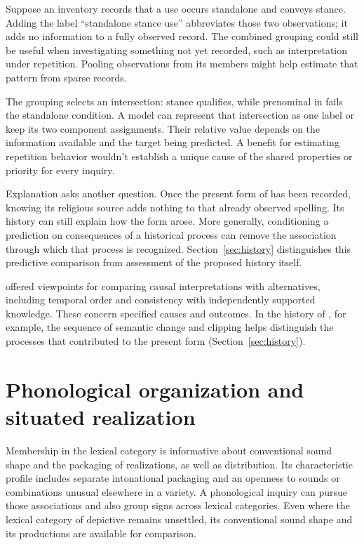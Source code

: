 \documentclass[12pt]{article}
\begin{document}
Suppose an inventory records that a use occurs standalone and conveys
stance. Adding the label \enquote{standalone stance use} abbreviates
those two observations; it adds no information to a fully observed
record. The combined grouping could still be useful when investigating
something not yet recorded, such as interpretation under repetition.
Pooling observations from its members might help estimate that pattern
from sparse records.

The grouping selects an intersection: stance  qualifies,
while prenominal  in  fails the
standalone condition. A model can represent that intersection as one
label or keep its two component assignments. Their relative value
depends on the information available and the target being predicted.
A benefit for estimating repetition behavior wouldn't establish a
unique cause of the shared properties or priority for every inquiry.

Explanation asks another question. Once the present form of 
has been recorded, knowing its religious source adds nothing to that
already observed spelling. Its history can still explain how the form
arose. More generally, conditioning a prediction on consequences of a
historical process can remove the association through which that process
is recognized. Section~\ref{sec:history} distinguishes this predictive
comparison from assessment of the proposed history itself.

\textcite[295--299]{hill1965} offered viewpoints for comparing causal
interpretations with alternatives, including temporal order and consistency
with independently supported knowledge. These concern specified causes
and outcomes. In the history of , for example, the
sequence of semantic change and clipping helps distinguish the processes
that contributed to the present form (Section~\ref{sec:history}).

\section{Phonological organization and situated realization}\label{sec:phonology}

Membership in the lexical category is informative about conventional sound
shape and the packaging of realizations, as well as distribution. Its characteristic profile includes separate intonational
packaging and an openness to sounds or combinations unusual elsewhere
in a variety. A phonological inquiry can pursue those associations
and also group signs across lexical categories. Even where the lexical
category of depictive  remains unsettled, its conventional
sound shape and its productions are available for comparison.
\end{document}

